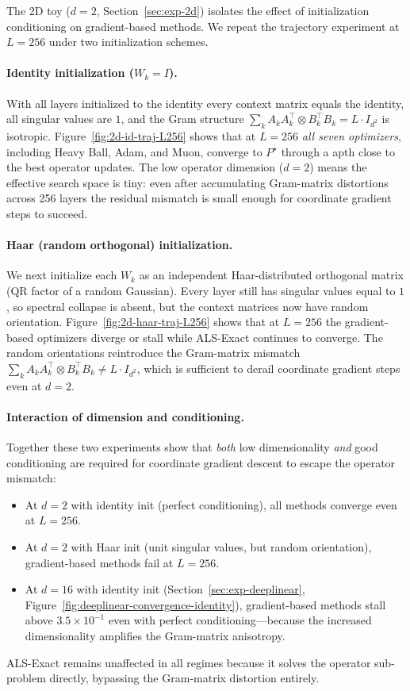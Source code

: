 \documentclass{article}
\begin{document}
The 2D toy ($d = 2$, Section~\ref{sec:exp-2d}) isolates the effect of
initialization conditioning on gradient-based methods.
We repeat the trajectory experiment at $L = 256$ under two initialization schemes.

\paragraph{Identity initialization ($W_k = I$).}
With all layers initialized to the identity every context matrix equals the identity,
all singular values are $1$, and the Gram structure
$\sum_k A_k A_k^\top \otimes B_k^\top B_k = L \cdot I_{d^2}$ is isotropic.
Figure~\ref{fig:2d-id-traj-L256} shows that at $L = 256$ \emph{all seven
  optimizers}, including Heavy Ball, Adam, and Muon, converge to $P^\star$ through a apth close to the best operator updates.
The low operator dimension ($d = 2$) means the effective search space is tiny:
even after accumulating Gram-matrix distortions across 256 layers the residual
mismatch is small enough for coordinate gradient steps to succeed.

\paragraph{Haar (random orthogonal) initialization.}
We next initialize each $W_k$ as an independent Haar-distributed orthogonal matrix
(QR factor of a random Gaussian).  Every layer still has singular values equal to $1$,
so spectral collapse is absent, but the context matrices now have random orientation.
Figure~\ref{fig:2d-haar-traj-L256} shows that at $L = 256$ the gradient-based
optimizers diverge or stall while ALS-Exact continues to converge.
The random orientations reintroduce the Gram-matrix mismatch
$\sum_k A_k A_k^\top \otimes B_k^\top B_k \neq L \cdot I_{d^2}$, which is
sufficient to derail coordinate gradient steps even at $d = 2$.

\paragraph{Interaction of dimension and conditioning.}
Together these two experiments show that \emph{both} low dimensionality
\emph{and} good conditioning are required for coordinate gradient descent to
escape the operator mismatch:
\begin{itemize}
  \item At $d = 2$ with identity init (perfect conditioning), all methods converge
    even at $L = 256$.
  \item At $d = 2$ with Haar init (unit singular values, but random orientation),
    gradient-based methods fail at $L = 256$.
  \item At $d = 16$ with identity init (Section~\ref{sec:exp-deeplinear},
    Figure~\ref{fig:deeplinear-convergence-identity}), gradient-based methods
    stall above $3.5 \times 10^{-1}$ even with perfect conditioning---because the
    increased dimensionality amplifies the Gram-matrix anisotropy.
\end{itemize}
ALS-Exact remains unaffected in all regimes because it solves the operator
sub-problem directly, bypassing the Gram-matrix distortion entirely.
\end{document}
